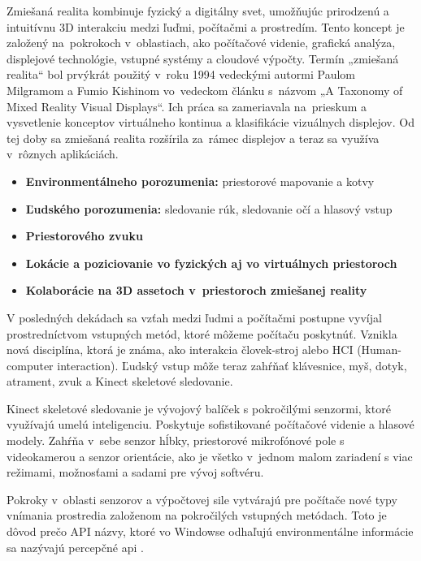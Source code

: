 Zmiešaná realita kombinuje fyzický a digitálny svet, umožňujúc prirodzenú a intuitívnu 3D interakciu medzi ľuďmi, počítačmi a prostredím. Tento koncept je založený na~pokrokoch v~oblastiach, ako počítačové videnie, grafická analýza, displejové technológie, vstupné systémy a cloudové výpočty. Termín „zmiešaná realita“ bol prvýkrát použitý v~roku 1994 vedeckými autormi Paulom Milgramom a Fumio Kishinom vo~vedeckom článku s~názvom „A Taxonomy of Mixed Reality Visual Displays“. Ich práca sa zameriavala na~prieskum a vysvetlenie konceptov virtuálneho kontinua a klasifikácie vizuálnych displejov. Od tej doby sa zmiešaná realita rozšírila za~rámec displejov a teraz sa využíva v~rôznych aplikáciách. %

\begin{itemize}
    \item \textbf{Environmentálneho porozumenia:} priestorové mapovanie a kotvy
    \item \textbf{Ľudského porozumenia:} sledovanie rúk, sledovanie očí a hlasový vstup
    \item \textbf{Priestorového zvuku}
    \item \textbf{Lokácie a poziciovanie vo fyzických aj vo virtuálnych priestoroch}
    \item \textbf{Kolaborácie na 3D assetoch v~priestoroch zmiešanej reality}
\end{itemize}

V posledných dekádach sa vzťah medzi ľudmi a počítačmi postupne vyvíjal prostredníctvom vstupných metód, ktoré môžeme počítaču poskytnúť. Vznikla nová disciplína, ktorá je známa, ako interakcia človek-stroj alebo HCI (Human-computer interaction). Ľudský vstup môže teraz zahŕňať klávesnice, myš, dotyk, atrament, zvuk a Kinect skeletové sledovanie.

Kinect skeletové sledovanie je vývojový balíček s pokročilými senzormi, ktoré využívajú umelú inteligenciu. Poskytuje sofistikované počítačové videnie a hlasové modely. Zahŕňa v~sebe senzor hĺbky, priestorové mikrofónové pole s videokamerou a senzor orientácie, ako je všetko v~jednom malom zariadení s viac režimami, možnosťami a sadami pre vývoj softvéru. 

Pokroky v~oblasti senzorov a výpočtovej sile vytvárajú pre počítače nové typy vnímania prostredia založenom na pokročilých vstupných metódach. Toto je dôvod prečo API názvy, ktoré vo Windowse odhaľujú environmentálne informácie sa nazývajú percepčné \gls{api} \cite{microsoft2023mixedreality}.

